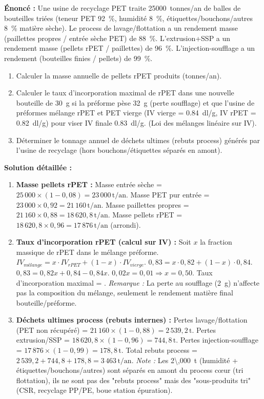 \documentclass[11pt]{article}
\begin{document}
\begin{exoresolu}
\textbf{Énoncé :} Une usine de recyclage PET traite \SI{25 000}{tonnes/an} de balles de bouteilles triées (teneur PET \SI{92}{\%}, humidité \SI{8}{\%}, étiquettes/bouchons/autres \SI{8}{\%} matière sèche). Le process de lavage/flottation a un rendement masse (paillettes propres / entrée sèche PET) de \SI{88}{\%}. L'extrusion+SSP a un rendement masse (pellets rPET / paillettes) de \SI{96}{\%}. L'injection-soufflage a un rendement (bouteilles finies / pellets) de \SI{99}{\%}.
\begin{enumerate}
    \item Calculer la masse annuelle de pellets rPET produits (tonnes/an).
    \item Calculer le taux d'incorporation maximal de rPET dans une nouvelle bouteille de \SI{30}{g} si la préforme pèse \SI{32}{g} (perte soufflage) et que l'usine de préformes mélange rPET et PET vierge (IV vierge = \SI{0,84}{dl/g}, IV rPET = \SI{0,82}{dl/g}) pour viser IV finale \SI{0,83}{dl/g}. (Loi des mélanges linéaire sur IV).
    \item Déterminer le tonnage annuel de déchets ultimes (rebuts process) générés par l'usine de recyclage (hors bouchons/étiquettes séparés en amont).
\end{enumerate}
\tcblower
\textbf{Solution détaillée :}
\begin{enumerate}
    \item \textbf{Masse pellets rPET :}
    Masse entrée sèche = $25\,000 \times (1 - 0,08) = 23\,000\,\text{t/an}$.
    Masse PET pur entrée = $23\,000 \times 0,92 = 21\,160\,\text{t/an}$.
    Masse paillettes propres = $21\,160 \times 0,88 = 18\,620,8\,\text{t/an}$.
    Masse pellets rPET = $18\,620,8 \times 0,96 = \boxed{17\,876\,\text{t/an}}$ (arrondi).
    
    \item \textbf{Taux d'incorporation rPET (calcul sur IV) :}
    Soit $x$ la fraction massique de rPET dans le mélange préforme.
    $IV_{mélange} = x \cdot IV_{rPET} + (1-x) \cdot IV_{vierge}$.
    $0,83 = x \cdot 0,82 + (1-x) \cdot 0,84$.
    $0,83 = 0,82x + 0,84 - 0,84x$.
    $0,02x = 0,01 \Rightarrow x = 0,50$.
    Taux d'incorporation maximal = .
    \textit{Remarque :} La perte au soufflage (\SI{2}{g}) n'affecte pas la composition du mélange, seulement le rendement matière final bouteille/préforme.
    
    \item \textbf{Déchets ultimes process (rebuts internes) :}
    Pertes lavage/flottation (PET non récupéré) = $21\,160 \times (1-0,88) = 2\,539,2\,\text{t}$.
    Pertes extrusion/SSP = $18\,620,8 \times (1-0,96) = 744,8\,\text{t}$.
    Pertes injection-soufflage = $17\,876 \times (1-0,99) = 178,8\,\text{t}$.
    Total rebuts process = $2\,539,2 + 744,8 + 178,8 = \boxed{3\,463\,\text{t/an}}$.
    \textit{Note :} Les \SI{2\,000}{t} (humidité + étiquettes/bouchons/autres) sont séparés en amont du process cœur (tri flottation), ils ne sont pas des "rebuts process" mais des "sous-produits tri" (CSR, recyclage PP/PE, boue station épuration).
\end{enumerate}
\end{exoresolu}
\end{document}

